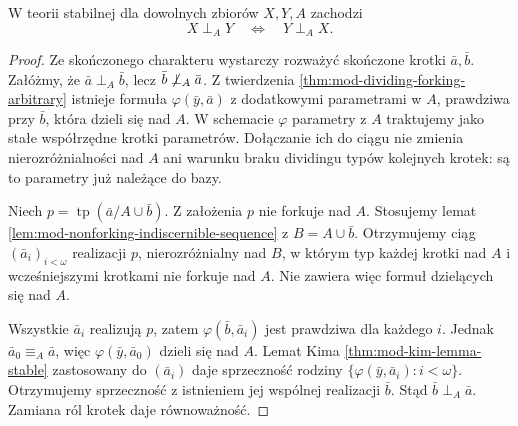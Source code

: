 \begin{twierdzenie}
\label{thm:mod-forking-symmetry-arbitrary}
W teorii stabilnej dla dowolnych zbiorów
$X,Y,A$ zachodzi
\[
X\mathrel{\perp_A}Y
\quad\Longleftrightarrow\quad
Y\mathrel{\perp_A}X.
\]
\end{twierdzenie}
\begin{proof}
Ze skończonego charakteru wystarczy rozważyć
skończone krotki $\bar a,\bar b$.
Załóżmy, że $\bar a\mathrel{\perp_A}\bar b$,
lecz $\bar b\not\mathrel{\perp_A}\bar a$.
Z twierdzenia
\ref{thm:mod-dividing-forking-arbitrary}
istnieje formuła
$\varphi(\bar y,\bar a)$ z dodatkowymi
parametrami w $A$, prawdziwa przy $\bar b$,
która dzieli się nad $A$.
W schemacie $\varphi$ parametry z $A$
traktujemy jako stałe współrzędne
krotki parametrów. Dołączanie ich do ciągu
nie zmienia nierozróżnialności nad $A$ ani
warunku braku dividingu typów kolejnych krotek:
są to parametry już należące do bazy.

Niech $p=\operatorname{tp}(\bar a/A\cup\bar b)$.
Z założenia $p$ nie forkuje nad $A$.
Stosujemy lemat
\ref{lem:mod-nonforking-indiscernible-sequence}
z $B=A\cup\bar b$.
Otrzymujemy ciąg $(\bar a_i)_{i<\omega}$
realizacji $p$, nierozróżnialny nad $B$,
w którym typ każdej krotki nad $A$
i wcześniejszymi krotkami nie forkuje nad $A$.
Nie zawiera więc formuł dzielących się nad $A$.

Wszystkie $\bar a_i$ realizują $p$,
zatem $\varphi(\bar b,\bar a_i)$
jest prawdziwa dla każdego $i$.
Jednak $\bar a_0\equiv_A\bar a$,
więc $\varphi(\bar y,\bar a_0)$
dzieli się nad $A$.
Lemat Kima \ref{thm:mod-kim-lemma-stable}
zastosowany do $(\bar a_i)$
daje sprzeczność rodziny
$\{\varphi(\bar y,\bar a_i):i<\omega\}$.
Otrzymujemy sprzeczność z istnieniem
jej wspólnej realizacji $\bar b$.
Stąd $\bar b\mathrel{\perp_A}\bar a$.
Zamiana ról krotek daje równoważność.
\end{proof}

